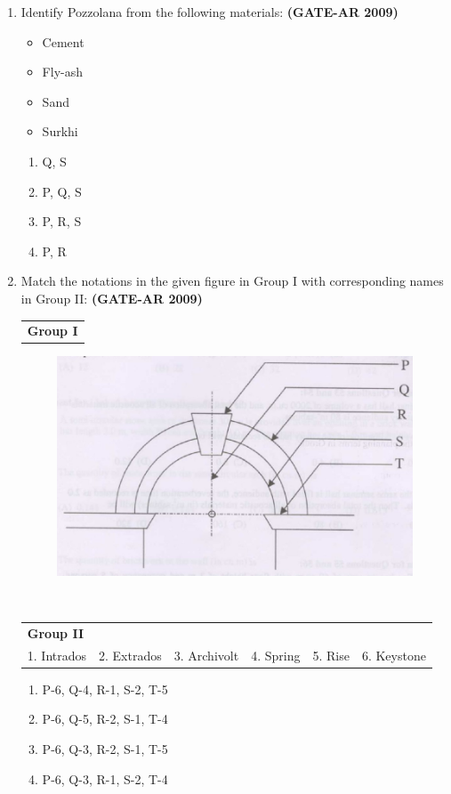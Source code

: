 \documentclass[a4paper,10pt]{article}
\begin{document}
\begin{enumerate}
    \item Identify Pozzolana from the following materials: \hfill \textbf{(GATE-AR 2009)}
    \begin{itemize}
        \item Cement
        \item Fly-ash
        \item Sand
        \item Surkhi
    \end{itemize}
    \begin{multicols}{2}
	\begin{enumerate}
        \item Q, S
        \item P, Q, S
        \item P, R, S
        \item P, R
    \end{enumerate}
	\end{multicols}

	\item Match the notations in the given figure in Group I with corresponding names in Group II: \hfill \textbf{(GATE-AR 2009)} \\
    \begin{tabular}{ l }
	\textbf{Group I} \\
	\end{tabular}
	\begin{figure}[h!]
        \centering
        \includegraphics[width=0.5\linewidth]{figs/img_04.jpg}
        \label{fig:Img04}
    \end{figure} \\
    \begin{tabular}{ l l l l l l }
	\textbf{Group II} & & & & & \\
	1. Intrados & 2. Extrados & 3. Archivolt & 4. Spring & 5. Rise & 6. Keystone \\
	\end{tabular}	
	\begin{enumerate}
        \item P-6, Q-4, R-1, S-2, T-5
        \item P-6, Q-5, R-2, S-1, T-4
        \item P-6, Q-3, R-2, S-1, T-5
        \item P-6, Q-3, R-1, S-2, T-4
    \end{enumerate}


\end{enumerate}
\end{document}
